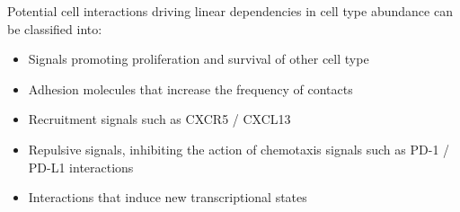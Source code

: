 \documentclass[11pt,a4paper]{article}
\begin{document}
Potential cell interactions driving linear dependencies in cell type abundance can be classified into:
\begin{itemize}
    \item Signals promoting proliferation and survival of other cell type
    \item Adhesion molecules that increase the frequency of contacts 
    \item Recruitment signals such as CXCR5 / CXCL13 \cite{van_de_pavert_chemokine_2009}
    \item Repulsive signals, inhibiting the action of chemotaxis signals such as PD-1 / PD-L1 interactions \cite{shi_pd-1_2018}
    \item Interactions that induce new transcriptional states 
\end{itemize}

\printbibliography
\end{document}
